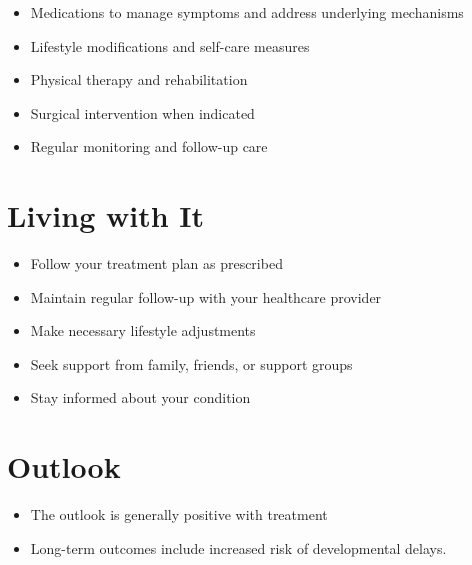 \begin{itemize}[noitemsep]
  \item Medications to manage symptoms and address underlying mechanisms
  \item Lifestyle modifications and self-care measures
  \item Physical therapy and rehabilitation
  \item Surgical intervention when indicated
  \item Regular monitoring and follow-up care
\end{itemize}
\section{Living with It}
\begin{itemize}[noitemsep]
  \item Follow your treatment plan as prescribed
  \item Maintain regular follow-up with your healthcare provider
  \item Make necessary lifestyle adjustments
  \item Seek support from family, friends, or support groups
  \item Stay informed about your condition
\end{itemize}
\section{Outlook}
\begin{itemize}[noitemsep]
  \item The outlook is generally positive with treatment
  \item Long-term outcomes include increased risk of developmental delays.
\end{itemize}
